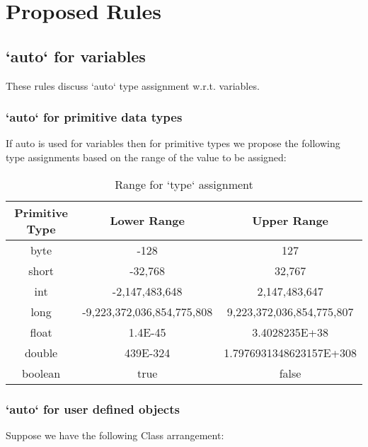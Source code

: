 \section{Proposed Rules}
\subsection{`auto` for variables}
These rules discuss `auto` type assignment w.r.t. variables. 
\subsubsection{`auto` for primitive data types}
If auto is used for variables then for primitive types we propose the following type assignments based on the range of the value to be assigned: 
\begin{table}[h]
\centering
\caption{Range for `type` assignment}
\begin{tabular}{|c|c|c|}
\hline
\textbf{Primitive Type} & \textbf{Lower Range}  & \textbf{Upper Range}\\
\hline
byte 			& 	-128 				& 127\\
short 			&   -32,768				&	32,767\\
int 			& 	-2,147,483,648		&	2,147,483,647\\
long			&	-9,223,372,036,854,775,808	& 9,223,372,036,854,775,807\\
float			& 	1.4E-45				& 3.4028235E+38\\
double  		&	439E-324			& 1.7976931348623157E+308\\
boolean 		& true	& false\\
\hline
\end{tabular}
\end{table}

\subsubsection{`auto` for user defined objects}
Suppose we have the following Class arrangement: 

